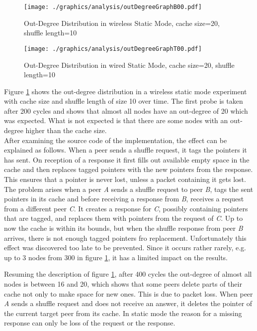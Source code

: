 \begin{figure}
	\texttt{[image: ./graphics/analysis/outDegreeGraphB00.pdf]}
	\caption{Out-Degree Distribution in wireless Static Mode, cache size=20,
	shuffle length=10}
	\label{fig:outDegreeDistB00}
\end{figure}

\begin{figure}
	\texttt{[image: ./graphics/analysis/outDegreeGraphT00.pdf]}
	\caption{Out-Degree Distribution in wired Static Mode, cache size=20, shuffle
	length=10}
	\label{fig:outDegreeDistT00}
\end{figure}

Figure \ref{fig:outDegreeDistB00} shows the out-degree distribution in a
wireless static mode experiment with cache size and shuffle length of size 10
over time. The first probe is taken after 200 cycles and shows that almost all
nodes have an out-degree of 20 which was expected. What is not expected is that
there are some nodes with an out-degree higher than the cache size.\\ 
After examining the source code of the implementation, the effect can be
explained as follows. When a peer sends a shuffle request, it tags the pointers
it has sent. On reception of a response it first fills out available empty space
in the cache and then replaces tagged pointers with the new pointers from the
response. This ensures that a pointer is never lost, unless a packet containing
it gets lost. The problem arises when a peer \emph{A} sends a shuffle request
to peer \emph{B}, tags the sent pointers in its cache and before receiving a
response from \emph{B}, receives a request from a different peer \emph{C}. It
creates a response for \emph{C}, possibly containing pointers that are tagged,
and replaces them with pointers from the request of \emph{C}. Up to now the
cache is within its bounds, but when the shuffle response from peer \emph{B}
arrives, there is not enough tagged pointers fro replacement. Unfortunately this
effect was discovered too late to be prevented. Since it occurs rather rarely,
e.g. up to 3 nodes from 300 in figure \ref{fig:outDegreeDistB00}, it has a
limited impact on the results.

Resuming the description of figure \ref{fig:outDegreeDistB00}, after 400 cycles
the out-degree of almost all nodes is between 16 and 20, which shows that some
peers delete parts of their cache not only to make space for new ones. This is
due to packet loss. When peer \emph{A} sends a shuffle request and does not
receive an answer, it deletes the pointer of the current target peer from its
cache. In static mode the reason for a missing response can only be loss of the
request or the response.

